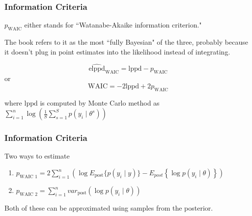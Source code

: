 \documentclass{beamer}
\begin{document}
\begin{frame}
\frametitle{Information Criteria}

$p_{\text{WAIC}}$ either stands for ``Watanabe-Akaike information criterion." 
\newline

The book refers to it as the most ``fully Bayesian" of the three, probably because it doesn't plug in point estimates into the likelihood instead of integrating.

\[
\widehat{\text{elppd}}_{\text{WAIC}} = \text{lppd} - p_{\text{WAIC}}
\]
or
\[
\text{WAIC} = -2\text{lppd} + 2 p_{\text{WAIC}}
\]

where $ \text{lppd}$ is computed by Monte Carlo method as $\sum_{i=1}^n \log \left(\frac{1}{S}\sum_{s=1}^S p(y_i \mid \theta^s) \right)$

\end{frame}

\begin{frame}
\frametitle{Information Criteria}

Two ways to estimate 

\begin{enumerate}
\item $p_{\text{WAIC 1}} = 2\sum_{i=1}^n \left( \log E_{\text{post}}\{p(y_i \mid y)\} - E_{post} \left\{  \log p(y_i \mid \theta) \right\} \right)$
\item $p_{\text{WAIC 2}} = \sum_{i=1}^n var_{\text{post}}(\log p(y_i \mid \theta))$
\end{enumerate}

Both of these can be approximated using samples from the posterior.

\end{frame}
\end{document}
